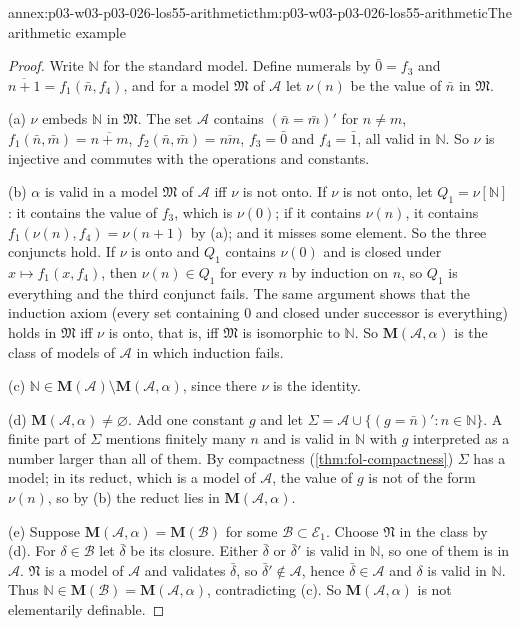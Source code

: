 \begin{annexitem}{annex:p03-w03-p03-026-los55-arithmetic}{thm:p03-w03-p03-026-los55-arithmetic}{The arithmetic example}
\begin{proof}
Write \(\mathbb N\) for the standard model.  Define numerals by
\(\bar 0=f_3\) and \(\overline{n+1}=f_1(\bar n,f_4)\), and for a model
\(\mathfrak M\) of \(\mathcal A\) let \(\nu(n)\) be the value of \(\bar n\) in
\(\mathfrak M\).

(a) \(\nu\) embeds \(\mathbb N\) in \(\mathfrak M\).  The set \(\mathcal A\)
contains \((\bar n=\bar m)'\) for \(n\neq m\),
\(f_1(\bar n,\bar m)=\overline{n+m}\), \(f_2(\bar n,\bar m)=\overline{nm}\),
\(f_3=\bar 0\) and \(f_4=\bar 1\), all valid in \(\mathbb N\).  So \(\nu\) is
injective and commutes with the operations and constants.

(b) \(\alpha\) is valid in a model \(\mathfrak M\) of \(\mathcal A\) iff \(\nu\)
is not onto.  If \(\nu\) is not onto, let \(Q_1=\nu[\mathbb N]\): it contains
the value of \(f_3\), which is \(\nu(0)\); if it contains \(\nu(n)\), it
contains \(f_1(\nu(n),f_4)=\nu(n+1)\) by (a); and it misses some element.  So
the three conjuncts hold.  If \(\nu\) is onto and \(Q_1\) contains
\(\nu(0)\) and is closed under \(x\mapsto f_1(x,f_4)\), then
\(\nu(n)\in Q_1\) for every \(n\) by induction on \(n\), so \(Q_1\) is
everything and the third conjunct fails.  The same argument shows that the
induction axiom (every set containing \(0\) and closed under successor is
everything) holds in \(\mathfrak M\) iff \(\nu\) is onto, that is, iff
\(\mathfrak M\) is isomorphic to \(\mathbb N\).  So
\(\mathbf M(\mathcal A,\alpha)\) is the class of models of \(\mathcal A\) in
which induction fails.

(c) \(\mathbb N\in\mathbf M(\mathcal A)\setminus\mathbf M(\mathcal A,\alpha)\),
since there \(\nu\) is the identity.

(d) \(\mathbf M(\mathcal A,\alpha)\neq\varnothing\).  Add one constant \(g\)
and let \(\Sigma=\mathcal A\cup\{(g=\bar n)':n\in\mathbb N\}\).  A finite part
of \(\Sigma\) mentions finitely many \(n\) and is valid in \(\mathbb N\) with
\(g\) interpreted as a number larger than all of them.  By compactness
(\cref{thm:fol-compactness}) \(\Sigma\) has a model; in its reduct, which is a
model of \(\mathcal A\), the value of \(g\) is not of the form \(\nu(n)\), so
by (b) the reduct lies in \(\mathbf M(\mathcal A,\alpha)\).

(e) Suppose \(\mathbf M(\mathcal A,\alpha)=\mathbf M(\mathcal B)\) for some
\(\mathcal B\subset\mathcal E_1\).  Choose \(\mathfrak N\) in the class by (d).
For \(\delta\in\mathcal B\) let \(\bar\delta\) be its closure.  Either
\(\bar\delta\) or \(\bar\delta'\) is valid in \(\mathbb N\), so one of them is
in \(\mathcal A\).  \(\mathfrak N\) is a model of \(\mathcal A\) and validates
\(\bar\delta\), so \(\bar\delta'\notin\mathcal A\), hence
\(\bar\delta\in\mathcal A\) and \(\delta\) is valid in \(\mathbb N\).  Thus
\(\mathbb N\in\mathbf M(\mathcal B)=\mathbf M(\mathcal A,\alpha)\),
contradicting (c).  So \(\mathbf M(\mathcal A,\alpha)\) is not elementarily
definable.
\end{proof}
\end{annexitem}

